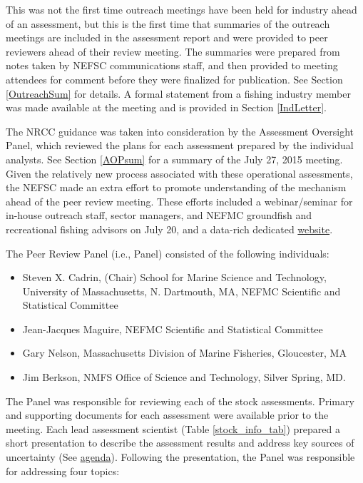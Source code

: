 This was not the first time  outreach meetings have been held for industry ahead of an assessment, but this is the first time that summaries of the outreach meetings are included in the assessment report and were provided to peer reviewers ahead of their review meeting. The summaries were prepared from notes taken by NEFSC communications staff, and then provided to meeting attendees for comment before they were finalized for publication.  See Section \ref{OutreachSum} for details.  A formal statement from a fishing industry member was made available at the meeting and is provided in Section \ref{IndLetter}. 

The NRCC guidance was taken into consideration by the Assessment Oversight Panel, which reviewed the plans for each assessment prepared by the individual analysts.  See Section \ref{AOPsum} for a summary of the July 27, 2015 meeting.  Given the relatively new process associated with these operational assessments, the NEFSC made an extra effort to promote understanding of the mechanism ahead of the peer review meeting.  These efforts included a webinar/seminar for in-house outreach staff, sector managers, and NEFMC groundfish and recreational fishing advisors on July 20, and a data-rich dedicated \href{http://www.nefsc.noaa.gov/groundfish/operational-assessments-2015/}{website}{}.

The Peer Review Panel (i.e., Panel) consisted of the following individuals:
\begin{itemize}
\item Steven X. Cadrin,  (Chair) School for  Marine Science and Technology, University of Massachusetts, N. Dartmouth, MA, NEFMC Scientific and Statistical Committee
\item Jean-Jacques Maguire, NEFMC Scientific and Statistical Committee
\item Gary Nelson, Massachusetts Division of Marine Fisheries, Gloucester, MA
\item Jim Berkson, NMFS Office of Science and Technology, Silver Spring,  MD.
\end{itemize}

The Panel was responsible for reviewing each of the stock assessments.  Primary and supporting documents for each assessment were available prior to the meeting. Each lead assessment scientist (Table \ref{stock_info_tab}) prepared a short presentation to describe the assessment results and address key sources of uncertainty (See \href{http://www.nefsc.noaa.gov/groundfish/operational-assessments-2015/agenda.html}{agenda}). Following the presentation, the Panel was responsible for addressing four topics:

